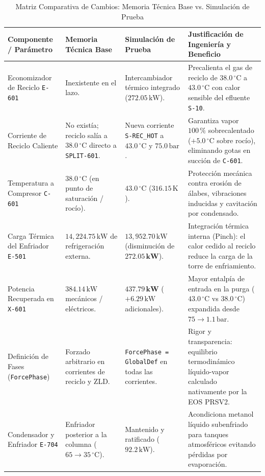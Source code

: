 \documentclass[11pt,a4paper]{article}
\begin{document}
\begin{table}[H]
\centering
\small
\caption{Matriz Comparativa de Cambios: Memoria Técnica Base vs. Simulación de Prueba}
\label{tab:matriz_comparativa}
\begin{tabularx}{\textwidth}{p{3.8cm} p{3.3cm} p{3.5cm} X}
\toprule
\textbf{Componente / Parámetro} & \textbf{Memoria Técnica Base} & \textbf{Simulación de Prueba} & \textbf{Justificación de Ingeniería y Beneficio} \\
\midrule
Economizador de Reciclo \texttt{E-601} & Inexistente en el lazo. & Intercambiador térmico integrado ($272.05\,\text{kW}$). & Precalienta el gas de reciclo de $38.0\,^\circ\text{C}$ a $43.0\,^\circ\text{C}$ con calor sensible del efluente \texttt{S-10}. \\
\addlinespace
Corriente de Reciclo Caliente & No existía; reciclo salía a $38.0\,^\circ\text{C}$ directo a \texttt{SPLIT-601}. & Nueva corriente \texttt{S-REC\_HOT} a $43.0\,^\circ\text{C}$ y $75.0\,\text{bar}$. & Garantiza vapor $100\,\%$ sobrecalentado ($+5.0\,^\circ\text{C}$ sobre rocío), eliminando gotas en succión de \texttt{C-601}. \\
\addlinespace
Temperatura a Compresor \texttt{C-601} & $38.0\,^\circ\text{C}$ (en punto de saturación / rocío). & $43.0\,^\circ\text{C}$ ($316.15\,\text{K}$). & Protección mecánica contra erosión de álabes, vibraciones inducidas y cavitación por condensado. \\
\addlinespace
Carga Térmica del Enfriador \texttt{E-501} & $14{,}224.75\,\text{kW}$ de refrigeración externa. & $13{,}952.70\,\text{kW}$ (disminución de $\mathbf{272.05\,\text{kW}}$). & Integración térmica interna (Pinch): el calor cedido al reciclo reduce la carga de la torre de enfriamiento. \\
\addlinespace
Potencia Recuperada en \texttt{X-601} & $384.14\,\text{kW}$ mecánicos / eléctricos. & $\mathbf{437.79\,\text{kW}}$ ($+6.29\,\text{kW}$ adicionales). & Mayor entalpía de entrada en la purga ($43.0\,^\circ\text{C}$ vs $38.0\,^\circ\text{C}$) expandida desde $75 \to 1.1\,\text{bar}$. \\
\addlinespace
Definición de Fases (\texttt{ForcePhase}) & Forzado arbitrario en corrientes de reciclo y ZLD. & \texttt{ForcePhase = GlobalDef} en todas las corrientes. & Rigor y transparencia: equilibrio termodinámico líquido-vapor calculado nativamente por la EOS PRSV2. \\
\addlinespace
Condensador y Enfriador \texttt{E-704} & Enfriador posterior a la columna ($65 \to 35\,^\circ\text{C}$). & Mantenido y ratificado ($92.2\,\text{kW}$). & Acondiciona metanol líquido subenfriado para tanques atmosféricos evitando pérdidas por evaporación. \\

\end{tabularx}
\end{table}
\end{document}
